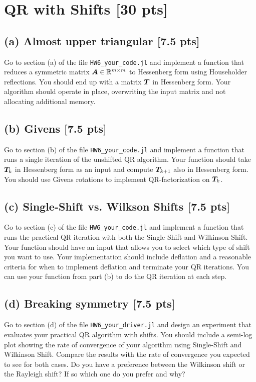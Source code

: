 \documentclass[twoside,10pt]{article}
\begin{document}
\section{QR with Shifts [30 pts]}
\subsection*{(a) Almost upper triangular [7.5 pts]} 
Go to section (a) of the file \texttt{HW6\_your\_code.jl} and implement a function that reduces a symmetric matrix $\bm{A} \in \mathbb{R}^{m\times m}$ to Hessenberg form using Householder reflections. You should end up with a matrix $\bm{T}$ in Hessenberg form. Your algorithm should operate in place, overwriting the input matrix and not allocating additional memory. 

\subsection*{(b) Givens [7.5 pts]} 
Go to section (b) of the file \texttt{HW6\_your\_code.jl} and implement a function that runs a single iteration of the unshifted QR algorithm. Your function should take $\bm{T}_{k}$ in Hessenberg form as an input and compute $\bm{T}_{k+1}$ also in Hessenberg form. You should use Givens rotations to implement QR-factorization on $\bm{T}_{k}$.

\subsection*{(c) Single-Shift vs. Wilkson Shifts [7.5 pts]}
Go to section (c) of the file \texttt{HW6\_your\_code.jl} and implement a function that runs the practical QR iteration with both the Single-Shift and Wilkinson Shift. Your function should have an input that allows you to select which type of shift you want to use.  Your implementation should include deflation and a reasonable criteria for when to implement deflation and terminate your QR iterations. You can use your function from part (b) to do the QR iteration at each step.

\subsection*{(d) Breaking symmetry [7.5 pts]}
Go to section (d) of the file \texttt{HW6\_your\_driver.jl} and design an experiment that evaluates your practical QR algorithm with shifts. You should include a semi-log plot showing the rate of convergence of your algorithm using Single-Shift and Wilkinson Shift. Compare the results with the rate of convergence you expected to see for both cases. Do you have a preference between the Wilkinson shift or the Rayleigh shift?  If so which one do you prefer and why?
\end{document}

